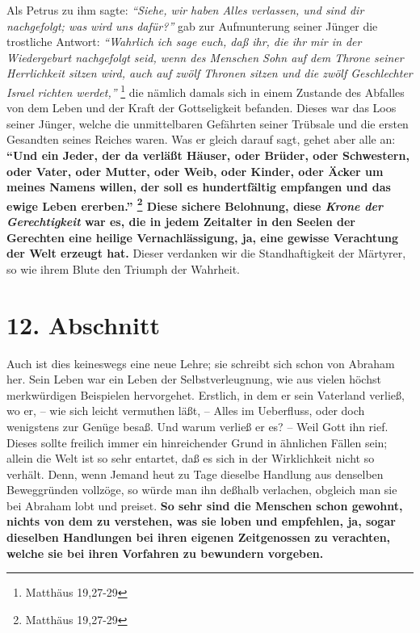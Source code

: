 Als Petrus zu ihm sagte:
\textit{"`Siehe, wir haben Alles verlassen, und sind dir
nachgefolgt; was wird uns dafür?"'}
gab zur Aufmunterung seiner Jünger die trostliche Antwort:
\textit{"`Wahrlich ich sage euch, daß ihr, die ihr mir in der
Wiedergeburt nachgefolgt seid, wenn des Menschen Sohn auf dem Throne seiner
Herrlichkeit sitzen wird, auch auf zwölf Thronen sitzen und die zwölf
Geschlechter Israel richten werdet,"'}
\footnote{Matthäus  19,27-29}
die nämlich
damals sich in einem Zustande des Abfalles von dem Leben und der Kraft der
Gottseligkeit befanden. Dieses war das Loos seiner Jünger, welche die
unmittelbaren Gefährten seiner Trübsale und die ersten Gesandten seines
Reiches waren. Was er gleich darauf sagt, gehet aber alle an:
\textbf{ "`Und ein
Jeder, der da verläßt Häuser, oder Brüder, oder Schwestern, oder Vater, oder
Mutter, oder Weib, oder Kinder, oder Äcker um meines Namens willen, der
soll es hundertfältig empfangen und das ewige Leben ererben."'
\footnote{Matthäus  19,27-29}
Diese sichere Belohnung, diese
\textit{Krone der Gerechtigkeit} 
war es, die in jedem Zeitalter in den Seelen der Gerechten
eine heilige Vernachlässigung, ja, eine gewisse Verachtung der Welt erzeugt
hat.} Dieser verdanken wir die Standhaftigkeit der Märtyrer, 
so wie ihrem
Blute den Triumph der Wahrheit.

\section{12. Abschnitt} \label{kap4_ab12}

Auch ist dies keineswegs eine neue Lehre; sie schreibt sich schon von
Abraham  her. Sein Leben war ein Leben der
Selbstverleugnung, wie aus vielen
höchst merkwürdigen Beispielen hervorgehet. Erstlich, in dem er sein Vaterland
verließ, wo er, -- wie sich leicht vermuthen läßt, -- Alles im Ueberfluss, oder
doch wenigstens zur Genüge besaß. Und warum verließ er es? -- Weil Gott ihn
rief. Dieses sollte freilich immer ein hinreichender Grund in ähnlichen Fällen
sein; allein die Welt ist so sehr entartet, daß es sich in der Wirklichkeit
nicht so verhält. Denn, wenn Jemand heut zu Tage dieselbe Handlung aus denselben
Beweggründen vollzöge, so würde man ihn deßhalb verlachen, obgleich man sie bei
Abraham lobt und preiset. \textbf{So sehr sind die Menschen schon gewohnt,
nichts von
dem zu verstehen, was sie loben und empfehlen, ja, sogar dieselben Handlungen
bei ihren eigenen Zeitgenossen zu verachten, welche sie bei ihren Vorfahren zu
bewundern vorgeben.}

